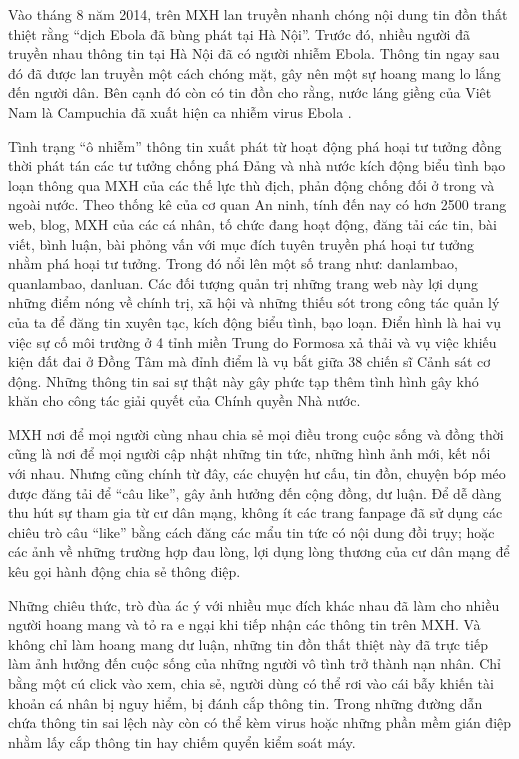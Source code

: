 		Vào tháng 8 năm 2014, trên MXH lan truyền nhanh chóng nội dung tin đồn thất thiệt rằng “dịch Ebola đã bùng phát tại Hà Nội”. Trước đó, nhiều người đã truyền nhau thông tin tại Hà Nội đã có người nhiễm Ebola. Thông tin ngay sau đó đã được lan truyền một cách chóng mặt, gây nên một sự hoang mang lo lắng đến người dân. Bên cạnh đó còn có tin đồn cho rằng, nước láng giềng của Viêt Nam là Campuchia đã xuất hiện ca nhiễm virus Ebola \cite{ebola}.
		
		Tình trạng “ô nhiễm” thông tin xuất phát từ hoạt động phá hoại tư tưởng đồng thời phát tán các tư tưởng chống phá Đảng và nhà nước kích động biểu tình bạo loạn thông qua MXH của các thế lực thù địch, phản động chống đối ở trong và ngoài nước. Theo thống kê của cơ quan An ninh, tính đến nay có hơn 2500 trang web, blog, MXH của các cá nhân, tố chức đang hoạt động, đăng tải các tin, bài viết, bình luận, bài phỏng vấn với mục đích tuyên truyền phá hoại tư tưởng nhằm phá hoại tư tưởng. Trong đó nổi lên một số trang như: danlambao, quanlambao, danluan. Các đối tượng quản trị những trang web này lợi dụng những điểm nóng về chính trị, xã hội và những thiếu sót trong công tác quản lý của ta để đăng tin xuyên tạc, kích động biểu tình, bạo loạn. Điển hình là hai vụ việc sự cố môi trường ở 4 tỉnh miền Trung do Formosa xả thải \cite{formusa} và vụ việc khiếu kiện đất đai ở Đồng Tâm mà đỉnh điểm là vụ bắt giữa 38 chiến sĩ Cảnh sát cơ động. Những thông tin sai sự thật này gây phức tạp thêm tình hình gây khó khăn cho công tác giải quyết của Chính quyền Nhà nước.
		
		MXH nơi để mọi người cùng nhau chia sẻ mọi điều trong cuộc sống và đồng thời cũng là nơi để mọi người cập nhật những tin tức, những hình ảnh mới, kết nối với nhau. Nhưng cũng chính từ đây, các chuyện hư cấu, tin đồn, chuyện bóp méo được đăng tải để “câu like”, gây ảnh hưởng đến cộng đồng, dư luận. Để dễ dàng thu hút sự tham gia từ cư dân mạng, không ít các trang fanpage đã sử dụng các chiêu trò câu “like” bằng cách đăng các mẩu tin tức có nội dung đồi trụy; hoặc các ảnh về những trường hợp đau lòng, lợi dụng lòng thương của cư dân mạng để kêu gọi hành động chia sẻ thông điệp.
		
		Những chiêu thức, trò đùa ác ý với nhiều mục đích khác nhau đã làm cho nhiều người hoang mang và tỏ ra e ngại khi tiếp nhận các thông tin trên MXH. Và không chỉ làm hoang mang dư luận, những tin đồn thất thiệt này đã trực tiếp làm ảnh hưởng đến cuộc sống của những người vô tình trở thành nạn nhân. Chỉ bằng một cú click vào xem, chia sẻ, người dùng có thể rơi vào cái bẫy khiến tài khoản cá nhân bị nguy hiểm, bị đánh cắp thông tin. Trong những đường dẫn chứa thông tin sai lệch này còn có thể kèm virus hoặc những phần mềm gián điệp nhằm lấy cắp thông tin hay chiếm quyển kiểm soát máy.
